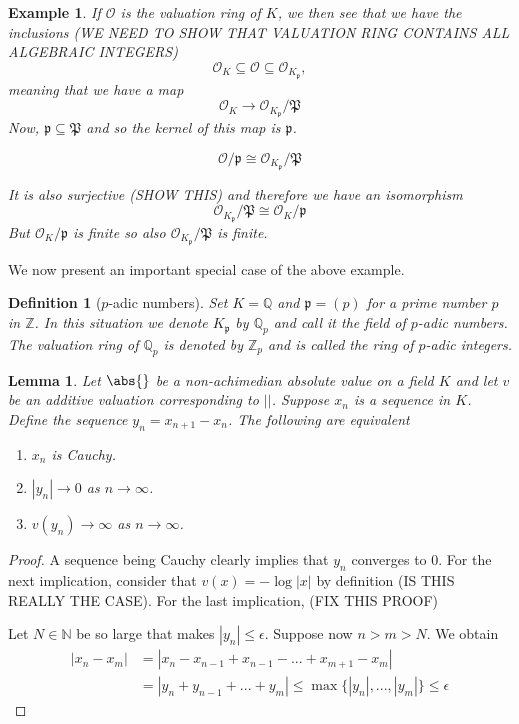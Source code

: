 \documentclass{article}
\newtheorem{definition}{Definition}[section]
\newtheorem{lemma}{Lemma}[section]
\newtheorem{example}{Example}[section]
\newcommand{\mfrak}[1]{\mathfrak{#1}}
\newcommand{\mcal}[1]{\mathcal{#1}}
\newcommand{\mbb}[1]{\mathbb{#1}}
\begin{document}
\begin{example}
    
    
    If $\mcal O$ is the valuation ring of $K$, we then see that we have the inclusions (WE NEED TO SHOW THAT VALUATION RING CONTAINS ALL ALGEBRAIC INTEGERS)
    $$\mcal O_K \subseteq \mcal O \subseteq \mcal O_{K_\mfrak p},$$  
    meaning that we have a map
    $$\mcal O_K \to \mcal O_{K_\mfrak p} / \mfrak P$$
    Now, $\mfrak p \subseteq \mfrak P$ and so the kernel of this map is $\mfrak p$. 

    $$\mcal O / \mfrak p \cong \mcal O_{K_\mfrak p} / \mfrak P$$
    
    
    It is also surjective (SHOW THIS) and therefore we have an isomorphism 
    $$\mcal O_{K_\mfrak p} / \mfrak P \cong \mcal O_K / \mfrak p$$
    But $\mcal O_K / \mfrak p$ is finite so also $\mcal O_{K_\mfrak p} / \mfrak P$ is finite. 
\end{example}

We now present an important special case of the above example.

\begin{definition}[$p$-adic numbers] 
    Set $K = \mbb Q$ and $\mfrak p = (p)$ for a prime number $p$ in $\mbb Z$. In this situation we denote $K_\mfrak p$ by $\mbb Q_p$ and call it the field of $p$-adic numbers. The valuation ring of $\mbb Q_p$ is denoted by $\mbb Z_p$ and is called the ring of $p$-adic integers.
\end{definition}



\begin{lemma} \label{lem:SufficientConditionForConvergence}
    Let $\abs{}$ be a non-achimedian absolute value on a field $K$ and let $v$ be an additive valuation corresponding to $||$. Suppose $x_n$ is a sequence in $K$. Define the sequence $y_n = x_{n+1} - x_{n}$. The following are equivalent
    \begin{enumerate}
        \item $x_n$ is Cauchy.
        \item $|y_n| \to 0$ as $n \to \infty$.
        \item $v(y_n) \to \infty$ as $n \to \infty$.
    \end{enumerate}
\end{lemma}
\begin{proof}
    A sequence being Cauchy clearly implies that $y_n$ converges to 0. For the next implication, consider that $v(x) = - \log |x|$ by definition (IS THIS REALLY THE CASE). For the last implication, (FIX THIS PROOF)
    
    Let $N \in \mbb N$ be so large that makes $|y_n| \leq \epsilon$. Suppose now $n > m > N$. We obtain
    \begin{align*}
        |x_n - x_m| &= |x_n - x_{n-1} + x_{n-1} - ... + x_{m+1} - x_{m}| \\ 
        &= |y_n + y_{n-1} + ... + y_{m}| \leq \max \{|y_n|, ..., |y_m|  \} \leq \epsilon
    \end{align*}
\end{proof}
\end{document}
